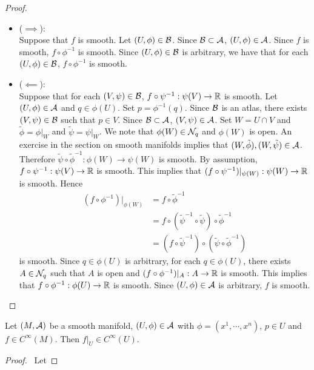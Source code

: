 \documentclass{book}
\begin{document}
	\begin{proof}\
		\begin{itemize}
			\item ($\implies$): \\
			Suppose that $f$ is smooth. Let $(U, \phi) \in \mathcal{B}$. Since $\mathcal{B} \subset \mathcal{A}$, $(U, \phi) \in \mathcal{A}$. Since $f$ is smooth, $ f \circ \phi^{-1}$ is smooth. Since $(U, \phi) \in \mathcal{B}$ is arbitrary, we have that for each $(U, \phi) \in \mathcal{B}$, $f \circ \phi^{-1}$ is smooth.
			\item ($\impliedby$): \\
			Suppose that for each $(V, \psi) \in \mathcal{B}$, $f \circ \psi^{-1}: \psi(V) \rightarrow \mathbb{R}$ is smooth. Let $(U, \phi) \in \mathcal{A}$ and $q \in \phi(U)$. Set $p = \phi^{-1}(q)$. Since $\mathcal{B}$ is an atlas, there exists $(V, \psi) \in \mathcal{B}$ such that $p \in V$. Since $\mathcal{B} \subset \mathcal{A}$, $(V, \psi) \in \mathcal{A}$. Set $W = U \cap V$ and $\tilde{\phi} = \phi|_W$ and $\tilde{\psi} = \psi|_W$. We note that $\phi(W) \in \mathcal{N}_q$ and $\phi(W)$ is open. An exercise in the section on smooth manifolds implies that $(W, \tilde{\phi}), (W, \tilde{\psi}) \in \mathcal{A}$. Therefore $\tilde{\psi} \circ \tilde{\phi}^{-1}: \phi(W) \rightarrow \psi(W)$ is smooth. By assumption, $f \circ \psi^{-1}: \psi(V) \rightarrow \mathbb{R}$ is smooth. This implies that $(f \circ \psi^{-1})|_{\psi(W)}: \psi(W) \rightarrow \mathbb{R}$ is smooth. Hence
			\begin{align*}
				(f \circ \phi^{-1})|_{\phi(W)}
				& = f \circ \tilde{\phi}^{-1} \\
				& = f \circ (\tilde{\psi}^{-1} \circ \tilde{\psi}) \circ \tilde{\phi}^{-1} \\
				& = (f \circ \tilde{\psi}^{-1}) \circ (\tilde{\psi} \circ \tilde{\phi}^{-1})
			\end{align*}
			is smooth. Since $q \in \phi(U)$ is arbitrary, for each $q \in \phi(U)$, there exists $A \in \mathcal{N}_q$ such that $A$ is open and $(f \circ \phi^{-1})|_{A}:A \rightarrow \mathbb{R}$ is smooth. This implies that $f \circ \phi^{-1}: \phi(U) \rightarrow \mathbb{R}$ is smooth. Since $(U, \phi) \in \mathcal{A}$ is arbitrary, $f$ is smooth.
		\end{itemize}
	\end{proof}
	
	\begin{ex}
	Let $(M, \mathcal{A})$ be a smooth manifold, $(U, \phi) \in \mathcal{A}$ with $\phi = (x^1, \cdots, x^n)$, $p \in U$ and $f \in C^{\infty}(M)$. Then $f|_U \in C^{\infty}(U)$.
	\end{ex}
	
	\begin{proof}\
	Let 
	\end{proof}
	
\end{document}
